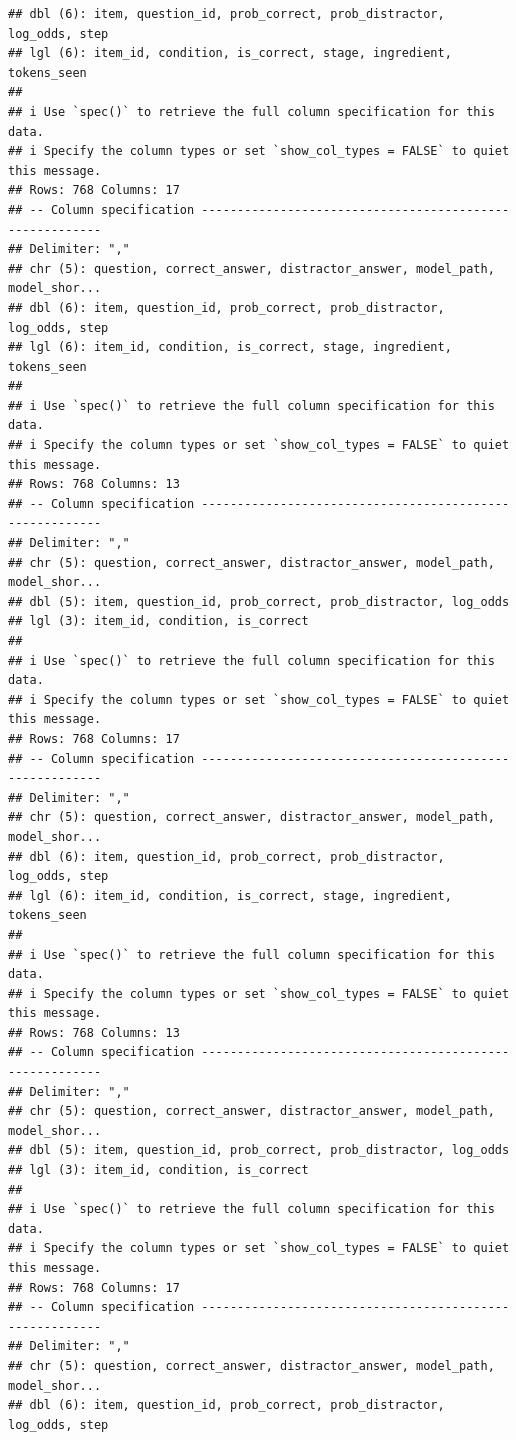 \documentclass[
]{article}
\begin{document}
\begin{verbatim}
## dbl (6): item, question_id, prob_correct, prob_distractor, log_odds, step
## lgl (6): item_id, condition, is_correct, stage, ingredient, tokens_seen
## 
## i Use `spec()` to retrieve the full column specification for this data.
## i Specify the column types or set `show_col_types = FALSE` to quiet this message.
## Rows: 768 Columns: 17
## -- Column specification --------------------------------------------------------
## Delimiter: ","
## chr (5): question, correct_answer, distractor_answer, model_path, model_shor...
## dbl (6): item, question_id, prob_correct, prob_distractor, log_odds, step
## lgl (6): item_id, condition, is_correct, stage, ingredient, tokens_seen
## 
## i Use `spec()` to retrieve the full column specification for this data.
## i Specify the column types or set `show_col_types = FALSE` to quiet this message.
## Rows: 768 Columns: 13
## -- Column specification --------------------------------------------------------
## Delimiter: ","
## chr (5): question, correct_answer, distractor_answer, model_path, model_shor...
## dbl (5): item, question_id, prob_correct, prob_distractor, log_odds
## lgl (3): item_id, condition, is_correct
## 
## i Use `spec()` to retrieve the full column specification for this data.
## i Specify the column types or set `show_col_types = FALSE` to quiet this message.
## Rows: 768 Columns: 17
## -- Column specification --------------------------------------------------------
## Delimiter: ","
## chr (5): question, correct_answer, distractor_answer, model_path, model_shor...
## dbl (6): item, question_id, prob_correct, prob_distractor, log_odds, step
## lgl (6): item_id, condition, is_correct, stage, ingredient, tokens_seen
## 
## i Use `spec()` to retrieve the full column specification for this data.
## i Specify the column types or set `show_col_types = FALSE` to quiet this message.
## Rows: 768 Columns: 13
## -- Column specification --------------------------------------------------------
## Delimiter: ","
## chr (5): question, correct_answer, distractor_answer, model_path, model_shor...
## dbl (5): item, question_id, prob_correct, prob_distractor, log_odds
## lgl (3): item_id, condition, is_correct
## 
## i Use `spec()` to retrieve the full column specification for this data.
## i Specify the column types or set `show_col_types = FALSE` to quiet this message.
## Rows: 768 Columns: 17
## -- Column specification --------------------------------------------------------
## Delimiter: ","
## chr (5): question, correct_answer, distractor_answer, model_path, model_shor...
## dbl (6): item, question_id, prob_correct, prob_distractor, log_odds, step

\end{verbatim}
\end{document}
